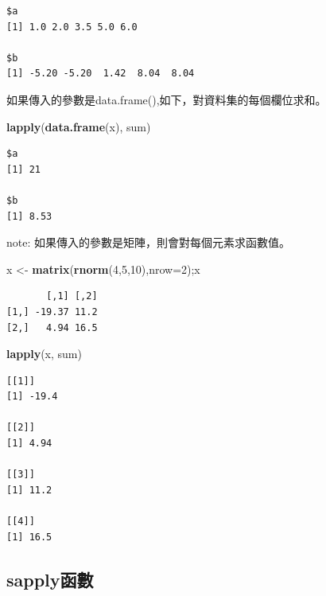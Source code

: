 \documentclass[]{book}
\newenvironment{Shaded}{\begin{snugshade}}{\end{snugshade}}
\newcommand{\DataTypeTok}[1]{\textcolor[rgb]{0.13,0.29,0.53}{#1}}
\newcommand{\DecValTok}[1]{\textcolor[rgb]{0.00,0.00,0.81}{#1}}
\newcommand{\KeywordTok}[1]{\textcolor[rgb]{0.13,0.29,0.53}{\textbf{#1}}}
\newcommand{\NormalTok}[1]{#1}
\newcommand{\StringTok}[1]{\textcolor[rgb]{0.31,0.60,0.02}{#1}}
\theoremstyle{definition}
\theoremstyle{definition}
\theoremstyle{definition}
\theoremstyle{remark}
\begin{document}
\begin{verbatim}
$a
[1] 1.0 2.0 3.5 5.0 6.0

$b
[1] -5.20 -5.20  1.42  8.04  8.04
\end{verbatim}

如果傳入的參數是data.frame(),如下，對資料集的每個欄位求和。

\begin{Shaded}
\begin{Highlighting}[]
\KeywordTok{lapply}\NormalTok{(}\KeywordTok{data.frame}\NormalTok{(x), sum)}
\end{Highlighting}
\end{Shaded}

\begin{verbatim}
$a
[1] 21

$b
[1] 8.53
\end{verbatim}

note: 如果傳入的參數是矩陣，則會對每個元素求函數值。

\begin{Shaded}
\begin{Highlighting}[]
\NormalTok{x <-}\StringTok{ }\KeywordTok{matrix}\NormalTok{(}\KeywordTok{rnorm}\NormalTok{(}\DecValTok{4}\NormalTok{,}\DecValTok{5}\NormalTok{,}\DecValTok{10}\NormalTok{),}\DataTypeTok{nrow=}\DecValTok{2}\NormalTok{);x}
\end{Highlighting}
\end{Shaded}

\begin{verbatim}
       [,1] [,2]
[1,] -19.37 11.2
[2,]   4.94 16.5
\end{verbatim}

\begin{Shaded}
\begin{Highlighting}[]
 \KeywordTok{lapply}\NormalTok{(x, sum)}
\end{Highlighting}
\end{Shaded}

\begin{verbatim}
[[1]]
[1] -19.4

[[2]]
[1] 4.94

[[3]]
[1] 11.2

[[4]]
[1] 16.5
\end{verbatim}

\hypertarget{sapply}{%
\subsection{sapply函數}\label{sapply}}
\end{document}
